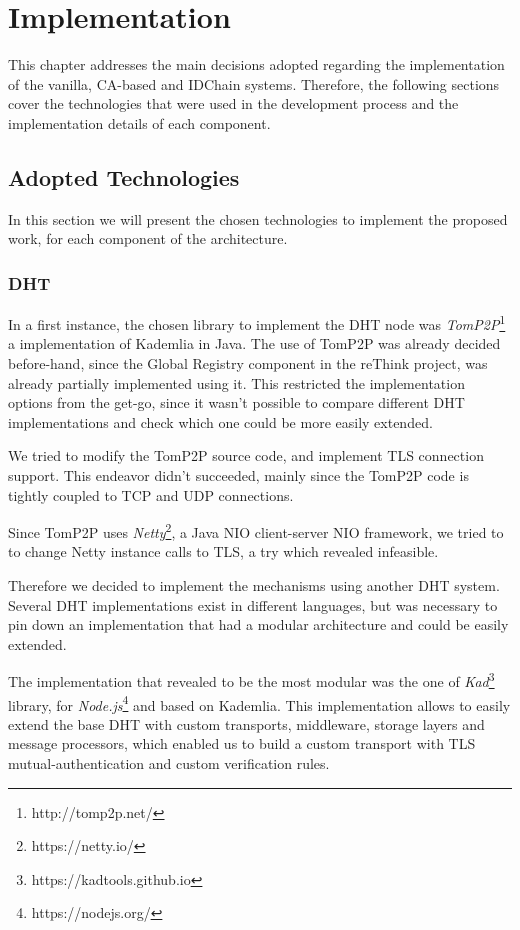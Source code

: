 \chapter{Implementation}
\label{chapter:implementation}

This chapter addresses the main decisions adopted regarding the implementation of the vanilla, CA-based and IDChain systems. Therefore, the following sections cover the technologies that were used in the development process and the implementation details of each component.

\section{Adopted Technologies}

In this section we will present the chosen technologies to implement the proposed work, for each component of the architecture.

\subsection{DHT}

In a first instance, the chosen library to implement the DHT node was \textit{TomP2P}\footnote{http://tomp2p.net/} a implementation of Kademlia in Java.
The use of TomP2P was already decided before-hand, since the Global Registry component in the reThink project, was already partially implemented using it.
This restricted the implementation options from the get-go, since it wasn't possible to compare different \ac{DHT} implementations and check which one could be more easily extended.

We tried to modify the TomP2P source code, and implement TLS connection support.
This endeavor didn't succeeded, mainly since the TomP2P code is tightly coupled to TCP and UDP connections.

Since TomP2P uses \textit{Netty}\footnote{https://netty.io/}, a Java NIO client-server \ac{NIO} framework, we tried to to change Netty instance calls to TLS, a try which revealed infeasible.

Therefore we decided to implement the mechanisms using another DHT system.
Several DHT implementations exist in different languages, but was necessary to pin down an implementation that had a modular architecture and could be easily extended.

The implementation that revealed to be the most modular was the one of \textit{Kad}\footnote{https://kadtools.github.io} library, for \textit{Node.js}\footnote{https://nodejs.org/} and based on Kademlia.
This implementation allows to easily extend the base DHT with custom transports, middleware, storage layers and message processors, which enabled us to build a custom transport with TLS mutual-authentication and custom verification rules.

